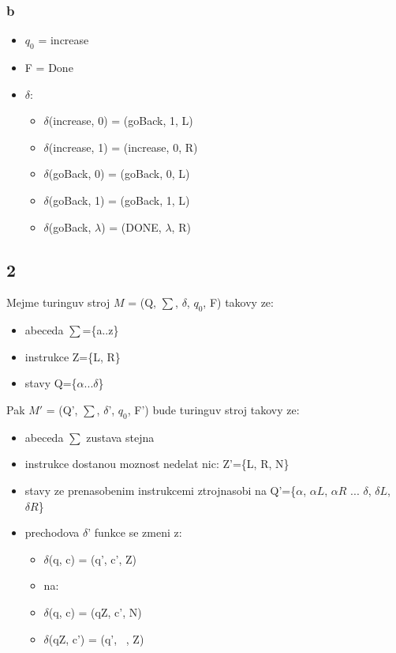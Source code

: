 \documentclass[a4paper]{article}
\begin{document}
\subsubsection*{b}
\begin{itemize}
    \item $q_0$ = increase
    \item F = Done
    \item $\delta$:
    \begin{itemize}
        \item $\delta$(increase, 0) = (goBack, 1, L)
        \item $\delta$(increase, 1) = (increase, 0, R)
        \item $\delta$(goBack, 0) = (goBack, 0, L)
        \item $\delta$(goBack, 1) = (goBack, 1, L)
        \item $\delta$(goBack, $\lambda$) = (DONE, $\lambda$, R)
    \end{itemize}
\end{itemize}


\subsection*{2}
Mejme turinguv stroj $M$ = (Q, $\sum$, $\delta$, $q_0$, F) takovy ze:
\begin{itemize}
	\item abeceda $\sum$=\{a..z\}
	\item instrukce Z=\{L, R\}
	\item stavy Q=\{$\alpha ... \delta$\}
\end{itemize}

Pak $M'$ = (Q', $\sum$, $\delta$', $q_0$, F') bude turinguv stroj takovy ze:
\begin{itemize}
	\item abeceda $\sum$ zustava stejna
	\item instrukce dostanou moznost nedelat nic: Z'=\{L, R, N\}
	\item stavy ze prenasobenim instrukcemi ztrojnasobi na Q'=\{$\alpha$, $\alpha L$, $\alpha R$ ... $\delta$, $\delta L$, $\delta R$\}
	\item prechodova $\delta$' funkce se zmeni z:
	\begin{itemize}
        \item $\delta$(q, c) = (q', c', Z)
		\item na:
        \item $\delta$(q, c) = (qZ, c', N)
        \item $\delta$(qZ, c') = (q', \ , Z)
	\end{itemize}
\end{itemize}
\end{document}
